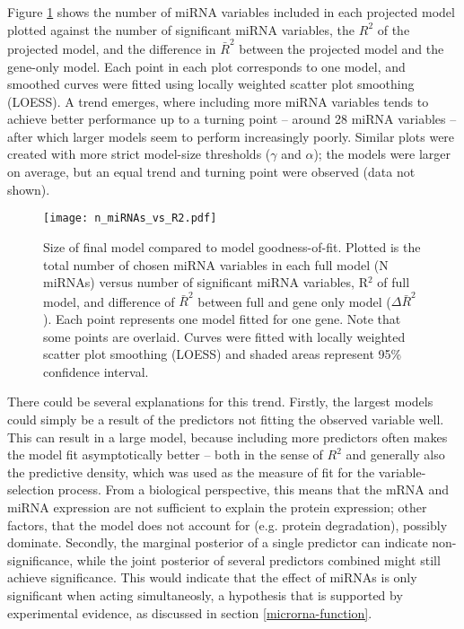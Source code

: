Figure \ref{n-miRNAs-vs-R2} shows the number of miRNA variables included in
each projected model plotted against the number of significant miRNA
variables, the $R^2$ of the projected model, and the difference in $\bar{R}^2$
between the projected model and the gene-only model. Each point in each plot
corresponds to one  model, and smoothed curves were fitted using locally
weighted scatter plot smoothing (LOESS). A trend emerges, where including more
miRNA variables tends to achieve better performance up to a turning point --
around 28 miRNA variables -- after which larger models seem to perform
increasingly poorly. Similar plots were created with more strict model-size
thresholds ($\gamma$ and $\alpha$); the models were larger on
average, but an equal trend and turning point were observed (data not shown).

\begin{figure}[htb]
  \centering
  \texttt{[image: n\_miRNAs\_vs\_R2.pdf]}
  \caption{Size of final model compared to model goodness-of-fit. Plotted is the total number of chosen miRNA variables in each full model (N miRNAs) versus number of significant miRNA variables, R$^2$ of full model, and difference of $\bar{R}^2$ between full and gene only model ($\Delta\bar{R}^2$). Each point represents one model fitted for one gene. Note that some points are overlaid. Curves were fitted with locally weighted scatter plot smoothing (LOESS) and shaded areas represent 95\% confidence interval. \label{n-miRNAs-vs-R2}}
\end{figure}

There could be several explanations for this trend. Firstly, the largest
models could simply be a result of the predictors not fitting the observed
variable well. This can result in a large model, because including more
predictors often makes the model fit asymptotically better -- both in the
sense of $R^2$ and generally also the predictive density, which was used as
the measure of fit for the variable-selection process. From a biological
perspective, this means that the mRNA and miRNA expression are not sufficient
to explain the protein expression; other factors, that the model does not
account for (e.g. protein degradation), possibly dominate.
Secondly, the marginal posterior of a single predictor can indicate
non-significance, while the joint posterior of several predictors combined
might still achieve significance. This would indicate that the effect of
miRNAs is only significant when acting simultaneosly, a hypothesis that is
supported by experimental evidence, as discussed in section
\ref{microrna-function}.

